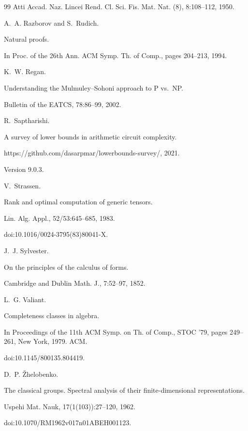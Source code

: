 \documentclass[10pt,a4paper]{article}
\begin{document}
\begin{thebibliography}{99}
Atti Accad. Naz. Lincei Rend. Cl. Sci. Fis. Mat. Nat. (8),
8:108–112, 1950.

A. A. Razborov and S. Rudich.


Natural proofs.


In Proc. of the 26th Ann. ACM Symp. Th. of Comp., pages
204–213, 1994.

K. W. Regan.


Understanding the Mulmuley–Sohoni approach to P vs. NP.


Bulletin of the EATCS, 78:86–99, 2002.

R. Saptharishi.


A survey of lower bounds in arithmetic circuit complexity.


https://github.com/dasarpmar/lowerbounds-survey/, 2021.


Version 9.0.3.

V. Strassen.


Rank and optimal computation of generic tensors.


Lin. Alg. Appl., 52/53:645–685, 1983.


doi:10.1016/0024-3795(83)80041-X.

J. J. Sylvester.


On the principles of the calculus of forms.


Cambridge and Dublin Math. J., 7:52–97, 1852.

L. G. Valiant.


Completeness classes in algebra.


In Proceedings of the 11th ACM Symp. on Th. of Comp., STOC
’79, pages 249–261, New York, 1979. ACM.


doi:10.1145/800135.804419.

D. P. Žhelobenko.


The classical groups. Spectral analysis of their finite-dimensional
representations.


Uspehi Mat. Nauk, 17(1(103)):27–120, 1962.


doi:10.1070/RM1962v017n01ABEH001123.

\end{thebibliography}
\end{document}
